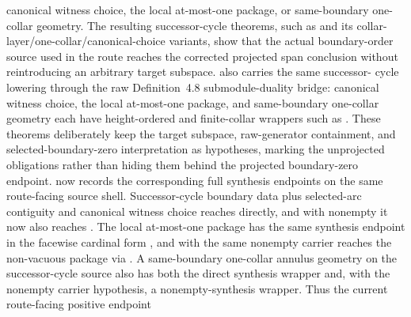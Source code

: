 \documentclass[11pt]{article}
\begin{document}
canonical witness choice, the local at-most-one package, or same-boundary
one-collar geometry.  The resulting successor-cycle theorems, such as
and its collar-layer/one-collar/canonical-choice variants, show that the
actual boundary-order source used in the route reaches the corrected projected
span conclusion without reintroducing an arbitrary target subspace.
 also carries the same successor-
cycle lowering through the raw Definition~4.8 submodule-duality bridge:
canonical witness choice, the local at-most-one package, and same-boundary
one-collar geometry each have height-ordered and finite-collar wrappers such as
.
These theorems deliberately keep the target subspace, raw-generator containment,
and selected-boundary-zero interpretation as hypotheses, marking the unprojected
 obligations rather than hiding them behind the
projected boundary-zero endpoint.
 now records the corresponding
full synthesis endpoints on the same route-facing source shell.  Successor-cycle
boundary data plus selected-arc contiguity and canonical witness choice reaches
 directly, and with nonempty
 it now also reaches
.  The local at-most-one package
has the same synthesis endpoint in the facewise cardinal form
,
and with the same nonempty carrier reaches the non-vacuous package via
.
A same-boundary one-collar annulus geometry on the successor-cycle source also
has both the direct synthesis wrapper and, with the nonempty carrier hypothesis,
a nonempty-synthesis wrapper.  Thus the current route-facing positive endpoint
\end{document}
